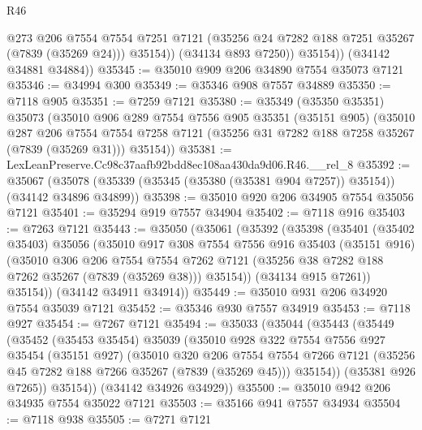 \begin{lexlean}{R46}
\begin{coremodule}
                @273
                @206
                @7554
                @7554
                @7251
                @7121
                (@35256 @24 @7282 @188 @7251 @35267 (@7839 (@35269 @24)))
                @35154))
            (@34134 @893 @7250))
          @35154))
      (@34142 @34881 @34884))
@35345 := @35010 @909 @206 @34890 @7554 @35073 @7121
@35346 := @34994 @300
@35349 := @35346 @908 @7557 @34889
@35350 := @7118 @905
@35351 := @7259 @7121
@35380 := @35349
    (@35350 @35351)
    @35073
    (@35010
      @906
      @289
      @7554
      @7556
      @905
      @35351
      (@35151 @905)
      (@35010
        @287
        @206
        @7554
        @7554
        @7258
        @7121
        (@35256 @31 @7282 @188 @7258 @35267 (@7839 (@35269 @31)))
        @35154))
@35381 := LexLeanPreserve.Cc98c37aafb92bdd8ec108aa430da9d06.R46.__rel_8
@35392 := @35067
    (@35078 (@35339 (@35345 (@35380 (@35381 @904 @7257)) @35154)) (@34142 @34896 @34899))
@35398 := @35010 @920 @206 @34905 @7554 @35056 @7121
@35401 := @35294 @919 @7557 @34904
@35402 := @7118 @916
@35403 := @7263 @7121
@35443 := @35050
    (@35061
      (@35392
        (@35398
          (@35401
            (@35402 @35403)
            @35056
            (@35010
              @917
              @308
              @7554
              @7556
              @916
              @35403
              (@35151 @916)
              (@35010
                @306
                @206
                @7554
                @7554
                @7262
                @7121
                (@35256 @38 @7282 @188 @7262 @35267 (@7839 (@35269 @38)))
                @35154))
            (@34134 @915 @7261))
          @35154))
      (@34142 @34911 @34914))
@35449 := @35010 @931 @206 @34920 @7554 @35039 @7121
@35452 := @35346 @930 @7557 @34919
@35453 := @7118 @927
@35454 := @7267 @7121
@35494 := @35033
    (@35044
      (@35443
        (@35449
          (@35452
            (@35453 @35454)
            @35039
            (@35010
              @928
              @322
              @7554
              @7556
              @927
              @35454
              (@35151 @927)
              (@35010
                @320
                @206
                @7554
                @7554
                @7266
                @7121
                (@35256 @45 @7282 @188 @7266 @35267 (@7839 (@35269 @45)))
                @35154))
            (@35381 @926 @7265))
          @35154))
      (@34142 @34926 @34929))
@35500 := @35010 @942 @206 @34935 @7554 @35022 @7121
@35503 := @35166 @941 @7557 @34934
@35504 := @7118 @938
@35505 := @7271 @7121

\end{coremodule}
\end{lexlean}
